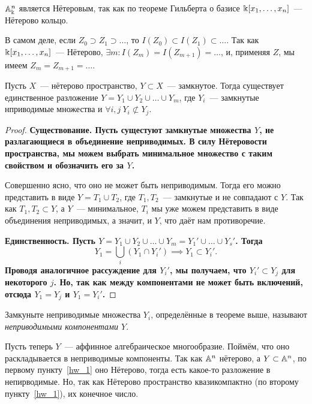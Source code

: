 	\begin{example}
		$\AA_{\bk}^n$ является Нётеровым, так как по теореме Гильберта о базисе $\bk[x_1, \ldots, x_n]$~--- Нётерово кольцо. 

		В самом деле, если $Z_0 \supset Z_1 \supset \ldots$, то $I(Z_0) \subset I(Z_1) \subset \ldots$. Так как $\bk[x_1, \ldots, x_n]$~--- Нётерово, $\exists m\colon I(Z_m) = I(Z_{m + 1}) = \ldots$, и, применяя $Z$, мы имеем $Z_m = Z_{m + 1} = \ldots$. 
	\end{example}

	\begin{theorem}[] 
		Пусть $X$~--- нётерово пространство, $Y \subset X$~--- замкнутое. Тогда существует единственное разложение $Y = Y_1 \cup Y_2 \cup \ldots \cup Y_m$, где $Y_i$~--- замкнутые нприводимые множества и $\forall i, j \ Y_i \not\subset Y_j$. 
	\end{theorem}
	\begin{proof}
		\bf{Существование.} Пусть сущестуют замкнутые множества $Y$, не разлагающиеся в объединение неприводимых. В силу Нётеровости пространства, мы можем выбрать минимальное множество с таким свойством и обозначить его за $Y$.

		Совершенно ясно, что оно не может быть неприводимым. Тогда его можно представить в виде $Y = T_1 \cup T_2$, где $T_1, T_2$~--- замкнутые и не совпадают с $Y$. Так как $T_1, T_2 \subset Y$, а $Y$~--- минимальное, $T_i$ мы уже можем представить в виде объединения неприводимых, а значит, и $Y$, что даёт нам противоречие. 

		\bf{Единственность.} Пусть $Y = Y_1 \cup Y_2 \cup \ldots \cup Y_m = Y_1' \cup \ldots \cup Y_s'$. Тогда 
		\[
			Y_1 = \bigcup_{i} (Y_1 \cap Y_i') \implies Y_1 \subset Y_i'.
		\]
		Проводя аналогичное рассуждение для $Y_i'$, мы получаем, что $Y_i' \subset Y_j$ для некоторого $j$. Но, так как между компонентами не может быть включений, отсюда $Y_1 = Y_j$ и $Y_1 = Y_i'$.
	\end{proof}


	\begin{definition} 
		Замкуныте неприводимые множества $Y_i$, определённые в теореме выше, называют \emph{неприводимыми компонентами $Y$}.
	\end{definition}

	Пусть теперь $Y$~--- аффинное алгебраическое многообразие. Поймём, что оно раскладывается в неприводимые компоненты. Так как $\AA^n$ нётерово, а $Y \subset \AA^n$, по первому пункту~\ref{hw_1} оно Нётерово, тогда есть какое-то разложение в непирводимые. Но, так как Нётерово пространство квазикомпактно (по второму пункту~\ref{hw_1}), их конечное число. 

